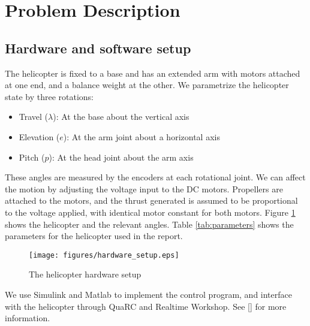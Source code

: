 \section{Problem Description}\label{sec:prob_descr}

\subsection{Hardware and software setup}
The helicopter is fixed to a base and has an extended arm with motors attached at one end,
and a balance weight at the other. We parametrize the helicopter state by three rotations:
\begin{itemize}
    \item Travel ($\lambda$): At the base about the vertical axis
    \item Elevation ($e$): At the arm joint about a horizontal axis
    \item Pitch ($p$): At the head joint about the arm axis
\end{itemize}
These angles are measured by the encoders at each rotational joint. We can affect the motion by adjusting the voltage input to the DC motors. Propellers are attached to the motors, and the thrust generated is assumed to be proportional to the voltage applied, with identical motor constant for both motors. Figure \ref{fig:hardware} shows the helicopter and the relevant angles. Table \ref{tab:parameters} shows the parameters for the helicopter used in the report.

\begin{figure}[htb]
	\centering
	\texttt{[image: figures/hardware\_setup.eps]}
	\caption{The helicopter hardware setup}
	\label{fig:hardware}
\end{figure}

We use Simulink and Matlab to implement the control program, and interface with the helicopter through QuaRC and Realtime Workshop. See [\cite{LabExercise}] for more information.

